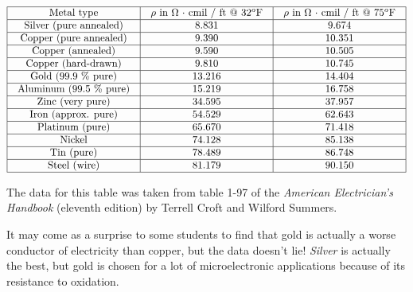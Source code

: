 $$\vbox{\offinterlineskip
\halign{\strut
\vrule \quad\hfil # \ \hfil & 
\vrule \quad\hfil # \ \hfil & 
\vrule \quad\hfil # \ \hfil \vrule \cr
\noalign{\hrule}
%
Metal type & $\rho$ in $\Omega$ $\cdot$ cmil / ft @ 32$^{o}$F & $\rho$ in $\Omega$ $\cdot$ cmil / ft @ 75$^{o}$F \cr
%
\noalign{\hrule}
%
Silver (pure annealed) & 8.831 & 9.674 \cr
%
\noalign{\hrule}
%
Copper (pure annealed) & 9.390 & 10.351 \cr
%
\noalign{\hrule}
%
Copper (annealed) & 9.590 & 10.505 \cr
%
\noalign{\hrule}
%
Copper (hard-drawn) & 9.810 & 10.745 \cr
%
\noalign{\hrule}
%
Gold (99.9 \% pure) & 13.216 & 14.404 \cr
%
\noalign{\hrule}
%
Aluminum (99.5 \% pure) & 15.219 & 16.758 \cr
%
\noalign{\hrule}
%
Zinc (very pure) & 34.595 & 37.957 \cr
%
\noalign{\hrule}
%
Iron (approx. pure) & 54.529 & 62.643 \cr
%
\noalign{\hrule}
%
Platinum (pure) & 65.670 & 71.418 \cr
%
\noalign{\hrule}
%
Nickel & 74.128 & 85.138 \cr
%
\noalign{\hrule}
%
Tin (pure) & 78.489 & 86.748 \cr
%
\noalign{\hrule}
%
Steel (wire) & 81.179 & 90.150 \cr
%
\noalign{\hrule}
} %
}$$ %







The data for this table was taken from table 1-97 of the {\it American Electrician's Handbook} (eleventh edition) by Terrell Croft and Wilford Summers.

It may come as a surprise to some students to find that gold is actually a worse conductor of electricity than copper, but the data doesn't lie!  {\it Silver} is actually the best, but gold is chosen for a lot of microelectronic applications because of its resistance to oxidation.




